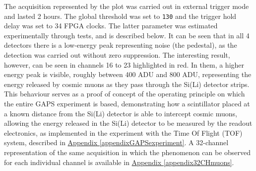 \par
The acquisition represented by the plot was carried out in external trigger mode and lasted 2 hours. The global threshold was set to \texttt{130} and the trigger hold delay was set to 34 FPGA clocks. The latter parameter was estimated experimentally through tests, and is described below. It can be seen that in all 4 detectors there is a low-energy peak representing noise (the pedestal), as the detection was carried out without zero suppression. The interesting result, however, can be seen in channels 16 to 23 highlighted in red. In them, a higher energy peak is visible, roughly between 400 ADU and 800 ADU, representing the energy released by cosmic muons as they pass through the Si(Li) detector strips. This behaviour serves as a proof of concept of the operating principle on which the entire GAPS experiment is based, demonstrating how a scintillator placed at a known distance from the Si(Li) detector is able to intercept cosmic muons, allowing the energy released in the Si(Li) detector to be measured by the readout electronics, as implemented in the experiment with the Time Of Flight (TOF) system, described in \hyperref[appendixGAPSexperiment]{Appendix \ref{appendixGAPSexperiment}}. A 32-channel representation of the same acquisition in which the phenomenon can be observed for each individual channel is available in \hyperref[appendix32CHmuons]{Appendix \ref{appendix32CHmuons}}.

